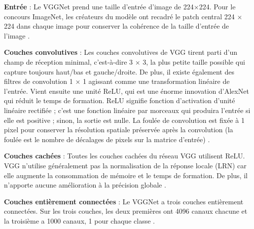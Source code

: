 	
	\begin{list}{--}{Un bref coup d'œil à l'architecture de VGG :}
		\item \textbf{Entrée} : Le VGGNet prend une taille d'entrée d'image de 224×224. Pour le concours ImageNet, les créateurs du modèle ont recadré le patch central 224 × 224 dans chaque image pour conserver la cohérence de la taille d'entrée de l'image \cite{simonyan2014very}.
		
		\item \textbf{Couches convolutives }: Les couches convolutives de VGG tirent parti d'un champ de réception minimal, c'est-à-dire 3 × 3, la plus petite taille possible qui capture toujours haut/bas et gauche/droite. De plus, il existe également des filtres de convolution 1 × 1 agissant comme une transformation linéaire de l'entrée. Vient ensuite une unité ReLU, qui est une énorme innovation d'AlexNet qui réduit le temps de formation. ReLU signifie fonction d'activation d'unité linéaire rectifiée ; c'est une fonction linéaire par morceaux qui produira l'entrée si elle est positive ; sinon, la sortie est nulle. La foulée de convolution est fixée à 1 pixel pour conserver la résolution spatiale préservée après la convolution (la foulée est le nombre de décalages de pixels sur la matrice d'entrée) \cite{krizhevsky2012imagenet,tammina2019transfer}.
		
		\item \textbf{Couches cachées} : Toutes les couches cachées du réseau VGG utilisent ReLU. VGG n'utilise généralement pas la normalisation de la réponse locale (LRN) car elle augmente la consommation de mémoire et le temps de formation. De plus, il n'apporte aucune amélioration à la précision globale \cite{tammina2019transfer}.
		
		\item \textbf{Couches entièrement connectées} : Le VGGNet a trois couches entièrement connectées. Sur les trois couches, les deux premières ont 4096 canaux chacune et la troisième a 1000 canaux, 1 pour chaque classe \cite{tammina2019transfer}.
	
	\end{list}
	

